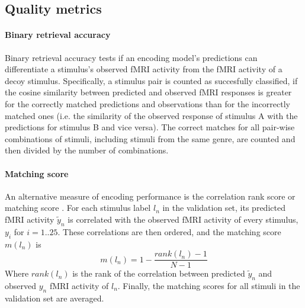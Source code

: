 \subsection*{Quality metrics} 

\paragraph{Binary retrieval accuracy}

Binary retrieval accuracy \citep{ML08} tests if an encoding model's predictions
can differentiate a stimulus's observed f{MRI} activity from the f{MRI} activity
of a decoy stimulus.
Specifically, a stimulus pair is counted as succesfully classified, if the cosine similarity between predicted and
observed f{MRI} responses is greater for the correctly matched predictions and
observations than for the incorrectly matched ones (i.e. the similarity of the observed response of
stimulus A with the predictions for stimulus B and vice versa).
The correct matches for all pair-wise combinations of stimuli, including stimuli from the
same genre, are counted and then divided by the number of combinations.

\paragraph{Matching score}
%
An alternative measure of encoding performance is the correlation rank score or
matching score \citep{SF14}. For each stimulus label $l_{n}$ in the validation set,
its predicted f{MRI} activity $\widetilde{y}_{n}$ is correlated with the
observed f{MRI} activity of every stimulus, $y_{i}$ for $i=1..25$. These
correlations are then ordered, and the  matching score $m(l_{n})$ is \[
m(l_{n}) = 1-\frac{rank(l_{n})-1}{N-1} \] Where $rank(l_{n})$ is the rank of
the correlation between predicted $\widetilde{y}_{n}$ and observed $y_{n}$
f{MRI} activity of $l_{n}$. Finally, the matching scores for all stimuli in the
validation set are averaged.



